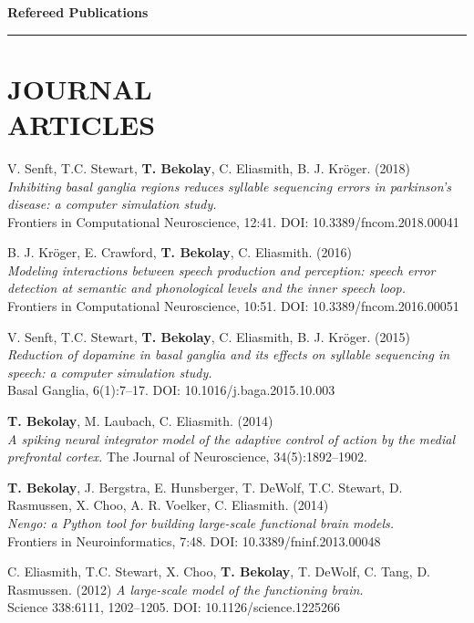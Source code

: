 \documentclass[line,margin]{res}
\begin{document}
\begin{resume}
{\Large \bf Refereed Publications} \\ \vspace{-8pt} \hrule

\section{JOURNAL \\ARTICLES}

V. Senft, T.C. Stewart, \textbf{T. Bekolay}, C. Eliasmith,
B. J. Kr\"{o}ger. (2018) \\
  {\sl Inhibiting basal ganglia regions reduces syllable sequencing errors
    in parkinson's disease: a computer simulation study.} \\
  Frontiers in Computational Neuroscience, 12:41.
  DOI: 10.3389/fncom.2018.00041

B. J. Kr\"{o}ger, E. Crawford, \textbf{T. Bekolay}, C. Eliasmith. (2016) \\
  {\sl Modeling interactions between speech production and perception:
  speech error detection at semantic and phonological levels
  and the inner speech loop.} \\
  Frontiers in Computational Neuroscience, 10:51.
  DOI: 10.3389/fncom.2016.00051

V. Senft, T.C. Stewart, \textbf{T. Bekolay}, C. Eliasmith,
B. J. Kr\"{o}ger. (2015) \\
  {\sl Reduction of dopamine in basal ganglia and its effects on
    syllable sequencing in speech: a computer simulation study.} \\
  Basal Ganglia, 6(1):7--17. DOI: 10.1016/j.baga.2015.10.003

\textbf{T. Bekolay}, M. Laubach, C. Eliasmith. (2014) \\
  {\sl A spiking neural integrator model of the adaptive control of action
  by the medial prefrontal cortex.}
  The Journal of Neuroscience, 34(5):1892--1902.

\textbf{T. Bekolay}, J. Bergstra, E. Hunsberger, T. DeWolf, T.C. Stewart,
  D. Rasmussen, X. Choo, A. R. Voelker, C. Eliasmith. (2014) \\
  {\sl Nengo: a Python tool for building large-scale functional
  brain models.} \\ Frontiers in Neuroinformatics, 7:48.
  DOI: 10.3389/fninf.2013.00048

C. Eliasmith, T.C. Stewart, X. Choo, \textbf{T. Bekolay},
  T. DeWolf, C. Tang, D. Rasmussen. (2012)
  {\sl A large-scale model of the functioning brain.} \\
  Science 338:6111, 1202--1205. DOI: 10.1126/science.1225266


\end{resume}
\end{document}
